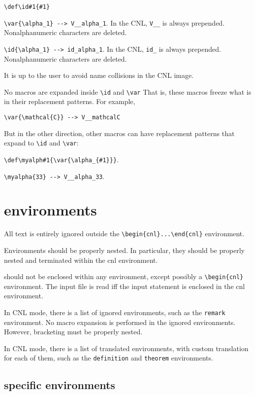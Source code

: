 \documentclass[12pt]{amsart}
\begin{document}
\verb!\def\id#1{#1}!

\verb!\var{\alpha_1} --> V__alpha_1!. In the CNL, \verb!V__! is always prepended.  Nonalphanumeric
characters are deleted.

\verb!\id{\alpha_1} --> id_alpha_1!.  In the CNL, \verb!id_! is always prepended. Nonalphanumeric
characters are deleted.

It is up to the user to avoid name collisions in the CNL image.

No macros are expanded inside \verb!\id! and \verb!\var!  That is, these macros freeze what is in their
replacement patterns.   
For example,

\verb!\var{\mathcal{C}} --> V__mathcalC!

But in the other direction, other macros can have replacement patterns that
expand to \verb!\id! and \verb!\var!:

\verb!\def\myalph#1{\var{\alpha_{#1}}}!.

\verb!\myalpha{33} --> V__alpha_33!.


\section{environments}

All text is entirely ignored outside the
\verb!\begin{cnl}...\end{cnl}! environment.

Environments should be properly nested.  In particular, they should be properly
nested and terminated within the cnl environment.

\verb!! should not be enclosed within any environment, except possibly a \verb!\begin{cnl}! environment.
The input file is read iff the input statement is enclosed in the cnl environment.

In CNL mode, there is a list of ignored environments, such as the
\verb!remark! environment.  No macro expansion is performed in
the ignored environments.  However, bracketing must be properly nested.


In CNL mode, there is a list of translated environments, with custom
translation for each of them, such as the \verb!definition!  and
\verb!theorem! environments.


\subsection{specific environments}
\end{document}
